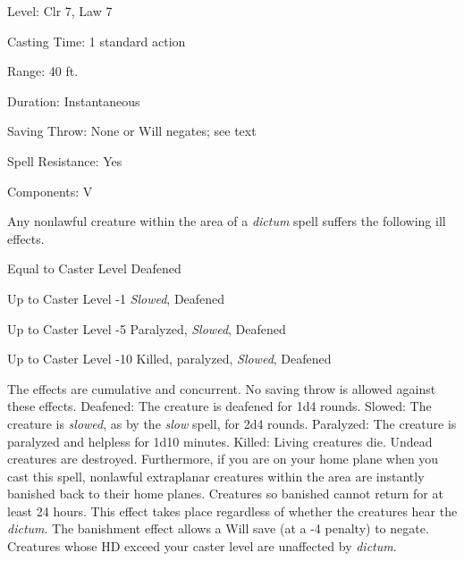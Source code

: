 
\begin{description*}
\item[Level:] Clr 7, Law 7
\item[Casting Time:] 1 standard action
\item[Range:] 40 ft.
\item[Duration:] Instantaneous
\item[Saving Throw:] None or Will negates; see text
\item[Spell Resistance:] Yes
\item[Components:] V
\end{description*}

Any nonlawful creature within the area of a \textit{dictum} spell suffers the following
ill effects.
\begin{description*}
\item[Equal to Caster Level] Deafened
\item[Up to Caster Level -1] \textit{Slowed}, Deafened
\item[Up to Caster Level -5] Paralyzed, \textit{Slowed}, Deafened
\item[Up to Caster Level -10] Killed, paralyzed, \textit{Slowed}, Deafened
\end{description*}
The effects are cumulative and concurrent. No saving throw is allowed against these
effects.
Deafened: The creature is deafened for 1d4 rounds.
Slowed: The creature is \textit{slowed}, as by the \textit{slow} spell,
for 2d4 rounds.
Paralyzed: The creature is paralyzed and helpless for 1d10 minutes.
Killed: Living creatures die. Undead creatures are destroyed.
Furthermore, if you are on your home plane when you cast this spell, nonlawful
extraplanar creatures within the area are instantly banished back to their home
planes. Creatures so banished cannot return for at least 24 hours. This effect
takes place regardless of whether the creatures hear the \textit{dictum}. The banishment
effect allows a Will save (at a -4 penalty) to negate.
Creatures whose HD exceed your caster level are unaffected by \textit{dictum}.